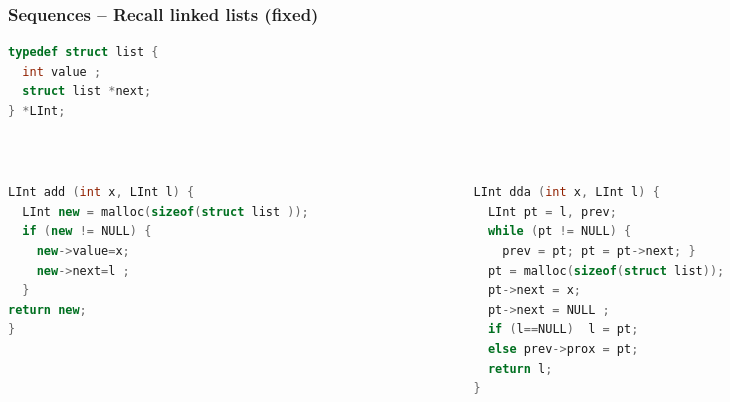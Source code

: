 \documentclass[aspectratio=169]{beamer}
\begin{document}
\begin{frame}[fragile]\frametitle{Sequences -- Recall linked lists (fixed)}
  
\begin{lstlisting}[language=C++,emph={list,LInt}]
typedef struct list {
  int value ;
  struct list *next;
} *LInt;
\end{lstlisting}
~\\[-7mm]
\begin{columns}
\begin{column}{.48\textwidth}
\begin{lstlisting}[language=C++, emph={prev,LInt},morekeywords={malloc}]
LInt add (int x, LInt l) {
  LInt new = malloc(sizeof(struct list ));
  if (new != NULL) {
    new->value=x;
    new->next=l ;
  }
return new;
}
\end{lstlisting}
%
\end{column}
\begin{column}{.50\textwidth}
%
\begin{lstlisting}[language=C++, emph={prev,LInt},morekeywords={malloc}]
LInt dda (int x, LInt l) {
  LInt pt = l, prev;
  while (pt != NULL) {
    prev = pt; pt = pt->next; }
  pt = malloc(sizeof(struct list));
  pt->next = x;
  pt->next = NULL ;
  if (l==NULL)  l = pt;
  else prev->prox = pt;
  return l;
}
\end{lstlisting}
%
\end{column}
\end{columns}

~\\[-6mm]
\end{frame}
\end{document}
